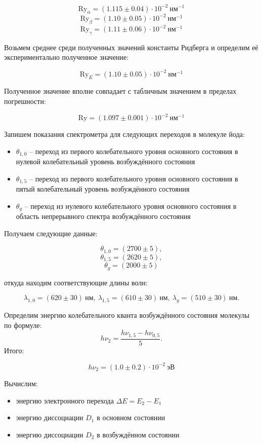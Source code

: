 \[ \text{Ry}_{\alpha}=(1.115\pm 0.04) \cdot 10^{-2} \ \text{нм}^{-1} \]
\[ \text{Ry}_{\beta} =(1.10\pm 0.05)\cdot 10^{-2} \ \text{нм}^{-1} \]
\[ \text{Ry}_{\gamma}=(1.11\pm 0.06)\cdot 10^{-2}\ \text{нм}^{-1} \]


Возьмем среднее среди полученных значений константы Ридберга и определим её
экспериментально полученное значение:

\[ \text{Ry}_E=(1.10\pm 0.05)\cdot 10^{-2} ~\text{нм}^{-1} \]

Полученное значение вполне совпадает с табличным значением в пределах
погрешности:

\[ \text{Ry}= (1.097 \pm 0.001)\cdot 10^{-2} \ \text{нм}^{-1} \]

Запишем показания спектрометра для следующих переходов в молекуле йода:
\begin{itemize}
  \item $\theta_{1,0}$ -- переход из первого колебательного уровня
        основного состояния в нулевой колебательный уровень возбуждённого
        состояния
  \item $\theta_{1,5}$ -- переход из первого колебательного уровня
        основного состояния в пятый колебательный уровень возбуждённого
        состояния
  \item $\theta_{g}$ -- переход из нулевого колебательного уровня
        основного состояния в область непрерывного спектра возбуждённого
        состояния
\end{itemize}

Получаем следующие данные:

\[  \theta_{1,0}=(2700\pm 5), \]
\[  \theta_{1,5}=(2620\pm 5), \]
\[  \theta_g=(2000\pm 5)  \]

откуда находим соответствующие длины волн:

\begin{equation*}
  \lambda_{1,0}=(620\pm 30) \ \text{нм}, \ \lambda_{1,5}=(610\pm 30) \ \text{нм}, \ \lambda_g=(510\pm 30)\ \text{нм}.
\end{equation*}

Определим энергию колебательного кванта возбуждённого состояния молекулы по
формуле:
\begin{equation*}
  h \nu_2=\dfrac{h\nu_{1,5}-h \nu_{0,5}}{5}.
\end{equation*}
Итого:

\[  h\nu_2=(1.0\pm 0.2)\cdot 10^{-2} \ \text{эВ} \]

Вычислим:
\begin{itemize}
  \item энергию электронного перехода $\Delta E=E_2-E_1$
  \item энергию диссоциации $D_1$ в основном состоянии
  \item энергию диссоциации $D_2$ в возбуждённом состоянии
\end{itemize}


